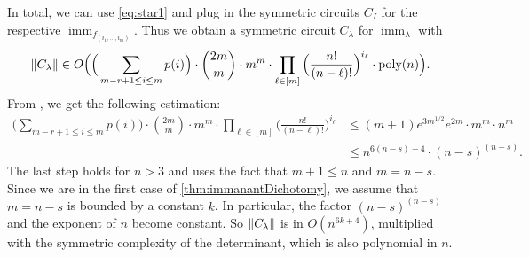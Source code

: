 \documentclass[10pt,a4paper]{article}
\theoremstyle{definition}
\theoremstyle{plain}
\theoremstyle{remark}
\DeclarePairedDelimiter{\norm}{\lVert}{\rVert}
\DeclareMathOperator{\imm}{imm}
\begin{document}
In total, we can use \cref{eq:star1} and plug in the symmetric circuits $C_I$ for the respective $\imm_{f_{(i_1,\dots ,i_m)}}$. Thus we obtain a symmetric circuit $C_\lambda$ for $\imm_\lambda$ with
\[
\norm{C_\lambda} \in O\Big( \Big(\sum_{m-r+1\leq i \leq m} p(i)\Big) \cdot \binom{2m}{m} \cdot  m^m \cdot \prod_{\ell \in [m]} \Big(\frac{n!}{(n-\ell)!} \Big)^{i_\ell} \cdot \text{poly}(n) \Big).
\]
From \cite{hartmann1985complexity}, we get the following estimation:
\begin{align*}
 \Big(\sum_{m-r+1\leq i \leq m} p(i)\Big) \cdot \binom{2m}{m} \cdot m^m \cdot \prod_{\ell \in [m]} \Big(\frac{n!}{(n-\ell)!} \Big)^{i_\ell} &\leq (m+1)e^{3m^{1/2}}e^{2m} \cdot m^m \cdot n^m\\
  &\leq n^{6(n-s)+4} \cdot (n-s)^{(n-s)}.
\end{align*}
The last step holds for $n > 3$ and uses the fact that $m+1 \leq n$ and $m=n-s$. Since we are in the first case of \cref{thm:immanantDichotomy}, we assume that $m = n-s$ is bounded by a constant $k$. In particular, the factor $(n-s)^{(n-s)}$ and the exponent of $n$ become constant.
So $\norm{C_\lambda}$ is in $O( n^{6k+4})$, multiplied with the symmetric complexity of the determinant, which is also polynomial in $n$.

	
	
\end{document}
